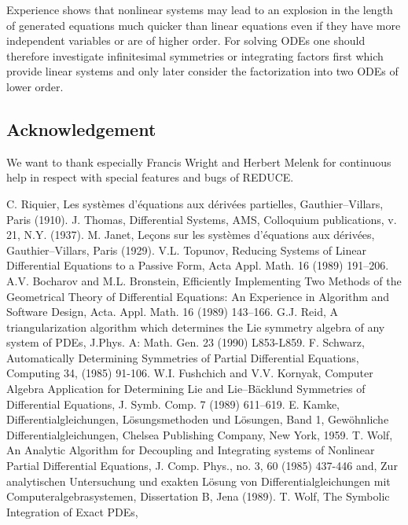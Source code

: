 Experience shows that nonlinear systems may lead to an
explosion in the length of generated equations much quicker
than linear equations
even if they have more independent variables or are of higher order.
For solving ODEs one should therefore investigate infinitesimal
symmetries or integrating factors first which provide linear systems
and only later consider the factorization into two ODEs of lower order.

\subsection{Acknowledgement}
We want to thank especially Francis Wright and Herbert Melenk for
continuous help in respect with special features and bugs of REDUCE.

\newpage
\begin{thebibliography}{99}
 C. Riquier, Les syst\`{e}mes d'\'{e}quations aux d\'{e}riv\'{e}es
partielles, Gauthier--Villars, Paris (1910).
 J. Thomas, Differential Systems, AMS, Colloquium
publications, v. 21, N.Y. (1937).
 M. Janet, Le\c{c}ons sur les syst\`{e}mes d'\'{e}quations aux
d\'{e}riv\'{e}es, Gauthier--Villars, Paris (1929).
 V.L. Topunov, Reducing Systems of Linear Differential
Equations to a Passive Form, Acta Appl. Math. 16 (1989) 191--206.
 A.V. Bocharov and M.L. Bronstein, Efficiently
Implementing Two Methods of the Geometrical Theory of Differential
Equations: An Experience in Algorithm and Software Design, Acta. Appl.
Math. 16 (1989) 143--166.
 G.J. Reid, A triangularization algorithm which
determines the Lie symmetry algebra of any system of PDEs, J.Phys. A:
Math. Gen. 23 (1990) L853-L859.
 F. Schwarz, Automatically Determining Symmetries of Partial
Differential Equations, Computing 34, (1985) 91-106.
 W.I. Fushchich and V.V. Kornyak, Computer Algebra
Application for Determining Lie and Lie--B\"{a}cklund Symmetries of
Differential Equations, J. Symb. Comp. 7 (1989) 611--619.
 E. Kamke, Differentialgleichungen, L\"{o}sungsmethoden
und L\"{o}sungen, Band 1, Gew\"{o}hnliche Differentialgleichungen,
Chelsea Publishing Company, New York, 1959.
 T. Wolf, An Analytic Algorithm for Decoupling and Integrating
systems of Nonlinear Partial Differential Equations, J. Comp. Phys.,
no. 3, 60 (1985) 437-446 and, Zur analytischen Untersuchung und exakten
L\"{o}sung von Differentialgleichungen mit Computeralgebrasystemen,
Dissertation B, Jena (1989).
 T. Wolf, The Symbolic Integration of Exact PDEs,

\end{thebibliography}
